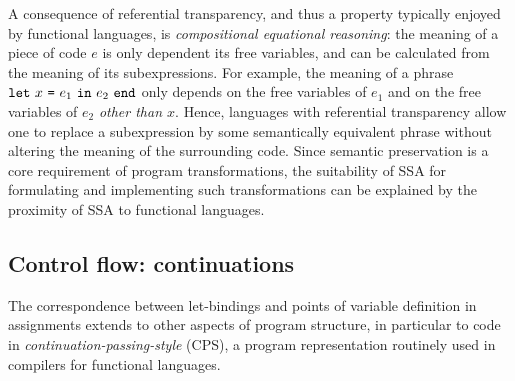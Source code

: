 A consequence of referential transparency, and thus a property
typically enjoyed by functional languages, is \emph{compositional
equational reasoning}: the meaning of a piece of code $e$ is only
dependent its free variables, and can be calculated from the meaning
of its subexpressions. For example, the meaning of a phrase $\texttt{let}\ {x}\ \texttt{=}\ {e_1}\ \texttt{in}\ {e_2}\ \texttt{end}$ only depends on the free variables of $e_1$ and on the
free variables of $e_2$ \emph{other than $x$}. Hence, languages with
referential transparency allow one to replace a subexpression by some
semantically equivalent phrase without altering the meaning of the
surrounding code. Since semantic preservation is a core requirement of
program transformations, the suitability of SSA for formulating and
implementing such transformations can be explained by the proximity of
SSA to functional languages.

\subsection{Control flow: continuations}
\label{section:Part1:Semantics:Continuations}
The correspondence between let-bindings and points of variable
definition in assignments extends to other aspects of program
structure, in particular to code in
\emph{continuation-passing-style} (CPS), a program
representation routinely used in compilers for functional languages.


